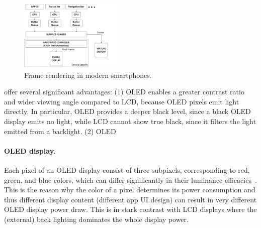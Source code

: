 


\begin{figure}[tp]
  \centering
        \includegraphics[width=0.45\textwidth]{./figure/1400_architecture.png}
        \vspace{-0.1in}
	\caption{Frame rendering in modern smartphones.}
        \vspace{-0.2in}
        \label{fig:arch}
\end{figure}

%
offer several
significant advantages: (1) OLED enables a greater contrast ratio and
wider viewing angle compared to LCD, because OLED pixels emit light
directly. In particular, OLED provides a deeper black level, since a
black OLED display emits no light, while
 LCD cannot show true black, since it filters the light emitted from a backlight.
 (2) OLED
 \fi


\paragraph{OLED display.}
Each pixel of an OLED display consist of three subpixels,
corresponding to red, green, and blue colors, which
can differ significantly in their luminance
efficacies~\cite{oled:2003,oled:2004}.  This is the reason why the color of a pixel determines
its power consumption and thus different display content (\eg different
app UI design) can result in very different OLED display power draw.
This is in stark contrast with LCD displays where the (external) back
lighting dominates the whole display power.

